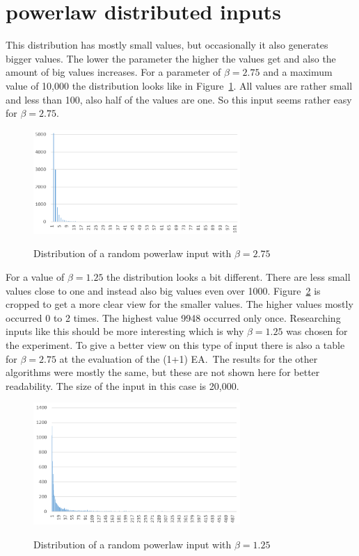 \section{powerlaw distributed inputs}
This distribution has mostly small values, but occasionally it also generates bigger values.
The lower the parameter the higher the values get and also the amount of big values increases.
For a parameter of $\beta=2.75$ and a maximum value of 10,000 the distribution looks like in Figure~\ref{fig:powerDistExample1}.
All values are rather small and less than 100, also half of the values are one.
So this input seems rather easy for $\beta=2.75$.

\begin{figure}[h]
      \caption{Distribution of a random powerlaw input with $\beta=2.75$}
      \centering
      \includegraphics[width=0.7\textwidth]{figures/images/numberGenerator/powerlaw_-2_75.png}\label{fig:powerDistExample1}
\end{figure}

For a value of $\beta=1.25$ the distribution looks a bit different.
There are less small values close to one and instead also big values even over 1000.
Figure~\ref{fig:powerDistExample2} is cropped to get a more clear view for the smaller values.
The higher values mostly occurred 0 to 2 times.
The highest value 9948 occurred only once.
Researching inputs like this should be more interesting which is why $\beta=1.25$ was chosen for the experiment.
To give a better view on this type of input there is also a table for $\beta=2.75$ at the evaluation of the (1+1) EA.\
The results for the other algorithms were mostly the same, but these are not shown here for better readability.
The size of the input in this case is 20,000.

\begin{figure}[h]
      \caption{Distribution of a random powerlaw input with $\beta=1.25$}
      \centering
      \includegraphics[width=0.7\textwidth]{figures/images/numberGenerator/powerlaw_-1_25.png}\label{fig:powerDistExample2}
\end{figure}
